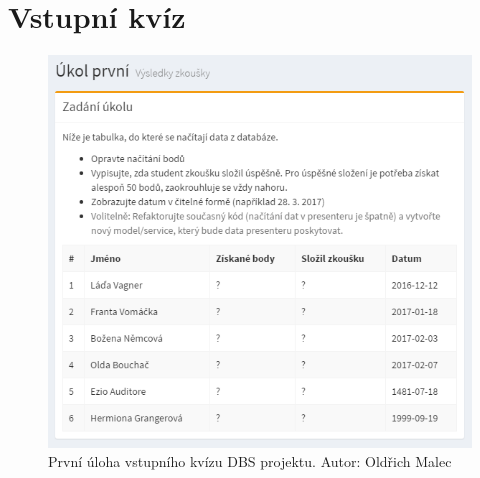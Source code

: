 \chapter{Vstupní kvíz} \label{ap:quiz}

\begin{figure}[h]
\includegraphics[width=\textwidth]{../png/quiz-1.png}
\caption{První úloha vstupního kvízu DBS projektu. Autor: Oldřich Malec} \label{picture:quiz-1}
\end{figure}

